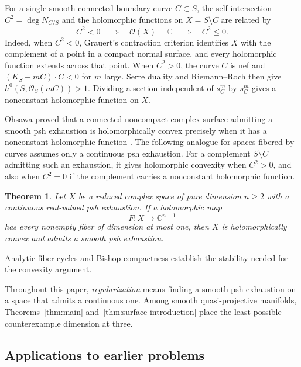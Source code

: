 \documentclass[11pt]{amsart}
\newtheorem{theorem}{Theorem}[section]
\theoremstyle{definition}
\theoremstyle{remark}
\numberwithin{equation}{section}
\newcommand{\C}{\mathbb C}
\newcommand{\OO}{\mathcal O}
\begin{document}
For a single smooth connected boundary curve $C\subset S$, the
self-intersection $C^2=\deg N_{C/S}$ and the holomorphic functions
on $X=S\setminus C$ are related by
\[
 C^2<0\quad\Longrightarrow\quad\OO(X)=\C
      \quad\Longrightarrow\quad C^2\le0.
\]
Indeed, when $C^2<0$, Grauert's contraction criterion
\cite[\S4, 8(e)]{Grauert1962} identifies $X$ with the complement of
a point in a compact normal surface, and every holomorphic function
extends across that point. When $C^2>0$, the curve $C$ is nef and
$(K_S-mC)\cdot C<0$ for $m$ large. Serre duality and Riemann--Roch
then give $h^0(S,\OO_S(mC))>1$. Dividing a section independent
of $s_C^m$ by $s_C^m$ gives a nonconstant holomorphic function on $X$.

Ohsawa proved that a connected noncompact complex surface admitting
a smooth psh exhaustion is holomorphically convex precisely when it has
a nonconstant holomorphic function \cite[Proposition~1.4, p.~156]{Ohsawa1981}.
The following analogue for spaces fibered by curves assumes only a
continuous psh exhaustion. For a complement $S\setminus C$ admitting
such an exhaustion, it gives holomorphic convexity when $C^2>0$, and
also when $C^2=0$ if the complement carries a nonconstant
holomorphic function.

\begin{theorem}\label{thm:curve-fiber-introduction}
Let $X$ be a reduced complex space of pure dimension $n\ge2$ with a
continuous real-valued psh exhaustion. If a holomorphic map
\[
F:X\longrightarrow\C^{n-1}
\]
has every nonempty fiber of dimension at most one, then $X$ is
holomorphically convex and admits a smooth psh exhaustion.
\end{theorem}

Analytic fiber cycles and Bishop compactness establish the stability
needed for the convexity argument.

Throughout this paper, \emph{regularization} means finding a smooth
psh exhaustion on a space that admits a continuous one. Among smooth
quasi-projective manifolds, Theorems~\ref{thm:main}
and~\ref{thm:surface-introduction} place the least possible
counterexample dimension at three.

\subsection{Applications to earlier problems}\label{subsec:applications}
\end{document}
